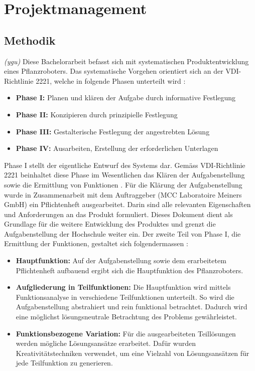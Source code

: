 \newpage
\section{Projektmanagement}
\subsection{Methodik}
\textit{(ygu)} Diese Bachelorarbeit befasst sich mit systematischen Produktentwicklung eines Pflanzroboters. Das systematische Vorgehen orientiert sich  an der VDI-Richtlinie 2221, welche in folgende Phasen unterteilt wird \cite{naefe}:

\begin{itemize}
	\item \textbf{Phase I:} Planen und klären der Aufgabe durch informative Festlegung
	
	\item \textbf{Phase II:} Konzipieren durch prinzipielle Festlegung
	
	\item \textbf{Phase III:} Gestalterische Festlegung der angestrebten Lösung
	
	\item \textbf{Phase IV:} Ausarbeiten, Erstellung der erforderlichen Unterlagen
	
\end{itemize}

Phase I stellt der eigentliche Entwurf des Systems dar. Gemäss VDI-Richtlinie 2221 beinhaltet diese Phase im Wesentlichen das Klären der Aufgabenstellung sowie die Ermittlung von Funktionen \cite{vdi2221}. Für die Klärung der Aufgabenstellung wurde in Zusammenarbeit mit dem Auftraggeber (MCC Laboratoire Meiners GmbH) ein Pflichtenheft ausgearbeitet. Darin sind alle relevanten Eigenschaften und Anforderungen an das Produkt formuliert. Dieses Dokument dient als Grundlage für die weitere Entwicklung des Produktes und grenzt die Aufgabenstellung der Hochschule weiter ein. Der zweite Teil von Phase I, die Ermittlung der Funktionen, gestaltet sich folgendermassen \cite{pahl}:

\begin{itemize}
	\item \textbf{Hauptfunktion:} Auf der Aufgabenstellung sowie dem erarbeitetem Pflichtenheft aufbauend ergibt sich die Hauptfunktion des Pflanzroboters.
	
	\item \textbf{Aufgliederung in Teilfunktionen:} Die Hauptfunktion wird mittels Funktionsanalyse in verschiedene Teilfunktionen unterteilt. So wird die Aufgabenstellung abstrahiert und rein funktional betrachtet. Dadurch wird eine möglichst lösungsneutrale Betrachtung des Problems gewährleistet. 
	
	\item \textbf{Funktionsbezogene Variation:} Für die ausgearbeiteten Teillösungen werden mögliche Lösungsansätze erarbeitet. Dafür wurden Kreativitätstechniken verwendet, um eine Vielzahl von Lösungsansätzen für jede Teilfunktion zu generieren.

\end{itemize}

